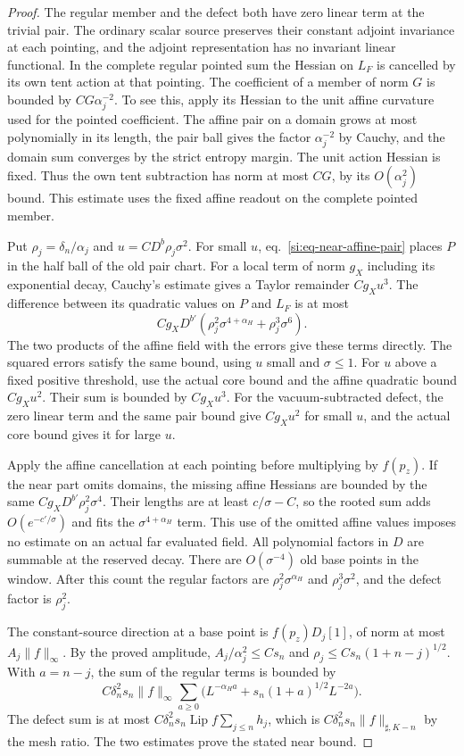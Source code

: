 \documentclass[11pt,letterpaper,reqno]{amsart}
\numberwithin{equation}{section}
\renewcommand{\eqref}[1]{\textup{eq.~\ref{#1}}}
\theoremstyle{definition}
\theoremstyle{remark}
\begin{document}
\begin{proof}
The regular member and the defect both have zero linear term
at the trivial pair. The ordinary scalar source preserves their
constant adjoint invariance at each pointing, and the adjoint
representation has no invariant linear functional. In the
complete regular pointed sum the Hessian on $L_F$ is cancelled
by its own tent action at that pointing. The coefficient of a
member of norm $G$ is bounded by $C G\alpha_j^{-2}$. To see this,
apply its Hessian to the unit affine curvature used for the
pointed coefficient. The affine pair on a domain grows at most
polynomially in its length, the pair ball gives the factor
$\alpha_j^{-2}$ by Cauchy, and the domain sum converges by the
strict entropy margin. The unit action Hessian is fixed. Thus
the own tent subtraction has norm at most $C G$, by its
$O(\alpha_j^2)$ bound. This estimate uses the fixed affine readout
on the complete pointed member.

Put $\rho_j=\delta_n/\alpha_j$ and $u=C D^b\rho_j\sigma^2$.
For small $u$, \eqref{si:eq-near-affine-pair} places $P$ in the
half ball of the old pair chart. For a local term of norm $g_X$
including its exponential decay, Cauchy's estimate gives a
Taylor remainder $C g_Xu^3$. The difference between its
quadratic values on $P$ and $L_F$ is at most
\[
 C g_X D^{b'}(\rho_j^2\sigma^{4+\alpha_H}
                         +\rho_j^3\sigma^6).
\]
The two products of the affine field with the errors give these
terms directly. The squared errors satisfy the same bound,
using $u$ small and $\sigma\le1$. For $u$ above a fixed positive
threshold, use the actual core bound and the affine quadratic
bound $C g_Xu^2$. Their sum is bounded by $C g_Xu^3$.
For the vacuum-subtracted defect, the zero linear term and the
same pair bound give $C g_Xu^2$ for small $u$, and the actual
core bound gives it for large $u$.

Apply the affine cancellation at each pointing before multiplying
by $f(p_z)$. If the near part omits domains, the missing affine
Hessians are bounded by the same $C g_X D^{b'}\rho_j^2\sigma^4$.
Their lengths are at least $c/\sigma-C$, so the rooted sum
adds $O(e^{-c'/\sigma})$ and fits the $\sigma^{4+\alpha_H}$ term.
This use of the omitted affine values imposes no estimate on
an actual far evaluated field. All polynomial factors in $D$
are summable at the reserved decay. There are $O(\sigma^{-4})$
old base points in the window. After this count the regular
factors are $\rho_j^2\sigma^{\alpha_H}$ and $\rho_j^3\sigma^2$,
and the defect factor is $\rho_j^2$.

The constant-source direction at a base point is $f(p_z)D_j[1]$,
of norm at most $A_j\|f\|_\infty$. By the proved amplitude,
$A_j/\alpha_j^2\le Cs_n$ and
$\rho_j\le Cs_n(1+n-j)^{1/2}$. With $a=n-j$, the sum of the
regular terms is bounded by
\[
 C\delta_n^2s_n\|f\|_\infty
     \sum_{a\ge0}\bigl(L^{-\alpha_Ha}+s_n(1+a)^{1/2}L^{-2a}\bigr).
\]
The defect sum is at most
$C\delta_n^2s_n\operatorname{Lip}f\sum_{j\le n}h_j$, which is
$C\delta_n^2s_n\|f\|_{\sharp,K-n}$ by the mesh ratio. The two
estimates prove the stated near bound.
\end{proof}
\end{document}
